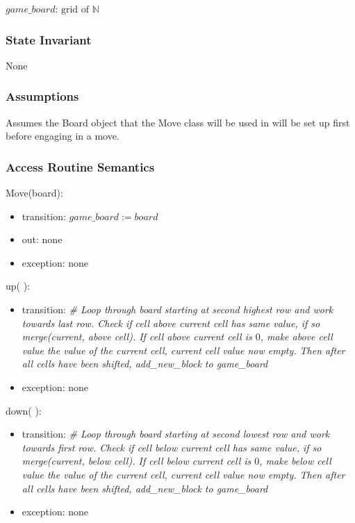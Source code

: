 \documentclass[12pt]{article}
\begin{document}
$\mathit{game\_board}$: $\text{grid of } \mathbb{N}$

\subsubsection* {State Invariant}

None

\subsubsection* {Assumptions}

Assumes the Board object that the Move class will be used in will be set up first before engaging in a move.  

\subsubsection* {Access Routine Semantics}

\noindent Move(board):
\begin{itemize}
\item transition: $\mathit{game\_board} := \mathit{board}$
\item out: none
\item exception: none
\end{itemize}

\noindent up( ):
\begin{itemize}
\item transition: \textit{\# Loop through board starting at second highest row and work towards last row. Check if cell above current cell has same value, if so merge(current, above cell). If cell above current cell is $0$, make above cell value the value of the current cell, current cell value now empty. Then after all cells have been shifted, add\_new\_block to game\_board} ~\\
\item exception: none
\end{itemize}

\noindent down( ):
\begin{itemize}
\item transition: \textit{\# Loop through board starting at second lowest row and work towards first row. Check if cell below current cell has same value, if so merge(current, below cell). If cell below current cell is $0$, make below cell value the value of the current cell, current cell value now empty. Then after all cells have been shifted, add\_new\_block to game\_board} ~\\
\item exception: none
\end{itemize}
\end{document}
